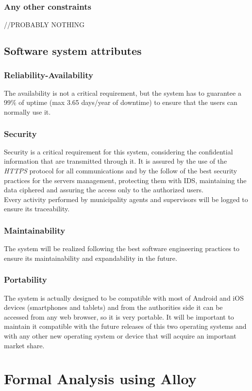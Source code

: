 \documentclass[a4paper]{report}
\begin{document}
\subsection{Any other constraints}
//PROBABLY NOTHING
\section{Software system attributes}
\subsection{Reliability-Availability}
The availability is not a critical requirement, but the system has to guarantee a 99\% of uptime (max 3.65 days/year of downtime) to ensure that the users can normally use it.
\subsection{Security}
Security is a critical requirement for this system, considering the confidential information that are transmitted through it. It is assured by the use of the \textit{HTTPS} protocol for all communications and by the follow of the best security practices for the servers management, protecting them with IDS, maintaining the data ciphered and assuring the access only to the authorized users. \\
Every activity performed by municipality agents and supervisors will be logged to ensure its traceability.
\subsection{Maintainability}
The system will be realized following the best software engineering practices to ensure its maintainability and expandability in the future.
\subsection{Portability}
The system is actually designed to be compatible with most of Android and iOS devices (smartphones and tablets) and from the authorities side it can be accessed from any web browser, so it is very portable.
It will be important to maintain it compatible with the future releases of this two operating systems and with any other new operating system or device that will acquire an important market share.
\chapter{Formal Analysis using Alloy}
\lipsum[3]
\end{document}
